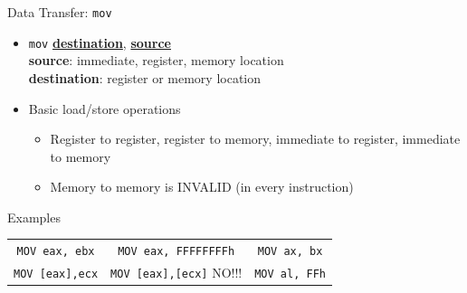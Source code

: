 \documentclass[]{beamer}
\begin{document}
\begin{frame}{Data Transfer: {\tt mov}}
  \begin{itemize}
  \item {\tt mov} \underline{\textbf{destination}}, \underline{\textbf{source}}\\
        \textbf{source}: immediate, register, memory location\\
	\textbf{destination}: register or memory location\\
  \item Basic load/store operations
  \begin{itemize}
  	\item Register to register, register to memory, immediate to register, immediate to memory
  	\item Memory to memory is INVALID (in every instruction)
  \end{itemize}
  \end{itemize}

  \begin{block}{Examples}
  	\centering
      \begin{tabular}{c|c|c}
        {\tt MOV eax, ebx} & {\tt MOV eax, FFFFFFFFh} & {\tt MOV ax, bx}\\[.4em]
        {\tt MOV [eax],ecx} & {\tt MOV [eax],[ecx]} \color{red}NO!!! & {\tt MOV al, FFh}\\
      \end{tabular}
  \end{block}
  
\end{frame}
\end{document}
